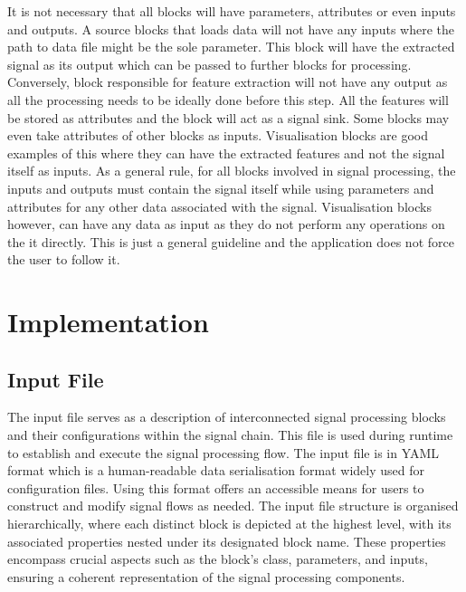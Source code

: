 \documentclass[journal]{IEEEtran}
\begin{document}
It is not necessary that all blocks will have parameters, attributes or even inputs and outputs. A source blocks that loads data will not have any inputs where the path to data file might be the sole parameter. This block will have the extracted signal as its output which can be passed to further blocks for processing. Conversely, block responsible for feature extraction will not have any output as all the processing needs to be ideally done before this step. All the features will be stored as attributes and the block will act as a signal sink. Some blocks may even take attributes of other blocks as inputs. Visualisation blocks are good examples of this where they can have the extracted features and not the signal itself as inputs. As a general rule, for all blocks involved in signal processing, the inputs and outputs must contain the signal itself while using parameters and attributes for any other data associated with the signal. Visualisation blocks however, can have any data as input as they do not perform any operations on the it directly. This is just a general guideline and the application does not force the user to follow it.

\section{Implementation}
\subsection{Input File}
The input file serves as a description of interconnected signal processing blocks and their configurations within the signal chain. This file is used during runtime to establish and execute the signal processing flow. The input file is in YAML format which is a human-readable data serialisation format \cite{OfficialYAMLWeb} widely used for configuration files. Using this format offers an accessible means for users to construct and modify signal flows as needed. The input file structure is organised hierarchically, where each distinct block is depicted at the highest level, with its associated properties nested under its designated block name. These properties encompass crucial aspects such as the block's class, parameters, and inputs, ensuring a coherent representation of the signal processing components. 


\end{document}
